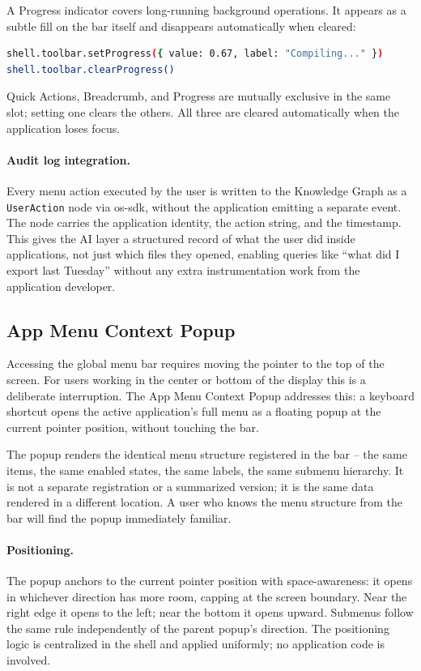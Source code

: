A Progress indicator covers long-running background operations. It appears as
a subtle fill on the bar itself and disappears automatically when cleared:

\begin{lstlisting}[language=bash, caption={Progress indicator}]
shell.toolbar.setProgress({ value: 0.67, label: "Compiling..." })
shell.toolbar.clearProgress()
\end{lstlisting}

Quick Actions, Breadcrumb, and Progress are mutually exclusive in the same
slot; setting one clears the others. All three are cleared automatically when
the application loses focus.

\paragraph{Audit log integration.}
Every menu action executed by the user is written to the Knowledge Graph as a
\texttt{UserAction} node via os-sdk, without the application emitting a
separate event. The node carries the application identity, the action string,
and the timestamp. This gives the AI layer a structured record of what the
user did inside applications, not just which files they opened, enabling
queries like ``what did I export last Tuesday'' without any extra
instrumentation work from the application developer.

\subsection{App Menu Context Popup}
\label{sec:menu-popup}

Accessing the global menu bar requires moving the pointer to the top of the
screen. For users working in the center or bottom of the display this is a
deliberate interruption. The App Menu Context Popup addresses this: a keyboard
shortcut opens the active application's full menu as a floating popup at the
current pointer position, without touching the bar.

The popup renders the identical menu structure registered in the bar --
the same items, the same enabled states, the same labels, the same submenu
hierarchy. It is not a separate registration or a summarized version; it is
the same data rendered in a different location. A user who knows the menu
structure from the bar will find the popup immediately familiar.

\paragraph{Positioning.}
The popup anchors to the current pointer position with space-awareness: it
opens in whichever direction has more room, capping at the screen boundary.
Near the right edge it opens to the left; near the bottom it opens upward.
Submenus follow the same rule independently of the parent popup's direction.
The positioning logic is centralized in the shell and applied uniformly; no
application code is involved.

